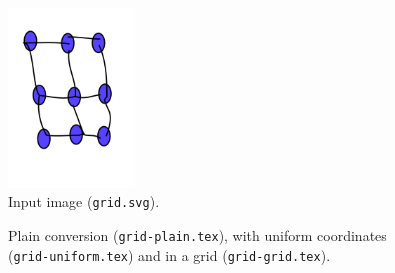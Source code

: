 \begin{figure}[H]
\centering
\includegraphics[width=0.3\textwidth]{grid.pdf}
\caption{Input image (\texttt{grid.svg}).}
\end{figure}

\begin{figure}[H]
\begin{minipage}{0.3\textwidth}
\begin{tikzpicture}

\end{tikzpicture}
\end{minipage}
\begin{minipage}{0.3\textwidth}
\begin{tikzpicture}

\end{tikzpicture}
\end{minipage}
\begin{minipage}{0.3\textwidth}
\begin{tikzpicture}

\end{tikzpicture}
\end{minipage}
\caption{Plain conversion (\texttt{grid-plain.tex}), with uniform coordinates (\texttt{grid-uniform.tex}) and in a grid (\texttt{grid-grid.tex}).}
\end{figure}
